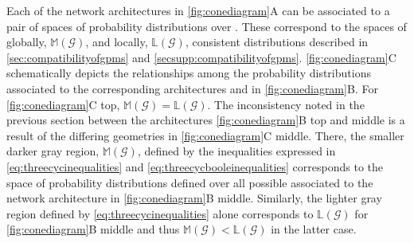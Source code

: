 Each of the network architectures in \ref{fig:conediagram}A can be associated to a pair of spaces of probability distributions over \gnpm{}. These correspond to the spaces of globally, $\mathbb{M}(\mathcal{G})$, and locally, $\mathbb{L}(\mathcal{G})$, consistent distributions described in \ref{sec:compatibilityofgpms} and \ref{secsupp:compatibilityofgpms}. \ref{fig:conediagram}C schematically depicts the relationships among the probability distributions associated to the corresponding architectures and \gnpm{} in \ref{fig:conediagram}B. For \ref{fig:conediagram}C top, $\mathbb{M}(\mathcal{G}) = \mathbb{L}(\mathcal{G})$. The inconsistency noted in the previous section between the architectures \ref{fig:conediagram}B top and middle is a result of the differing geometries in \ref{fig:conediagram}C middle. There, the smaller darker gray region, $\mathbb{M}(\mathcal{G})$, defined by the inequalities expressed in \ref{eq:threecycinequalities} and \ref{eq:threecycbooleinequalities} corresponds to the space of probability distributions defined over all possible \gnpm{} associated to the network architecture in \ref{fig:conediagram}B middle. Similarly, the lighter gray region defined by \ref{eq:threecycinequalities} alone corresponds to $\mathbb{L}(\mathcal{G})$ for \ref{fig:conediagram}B middle and thus $\mathbb{M}(\mathcal{G}) < \mathbb{L}(\mathcal{G})$ in the latter case.


